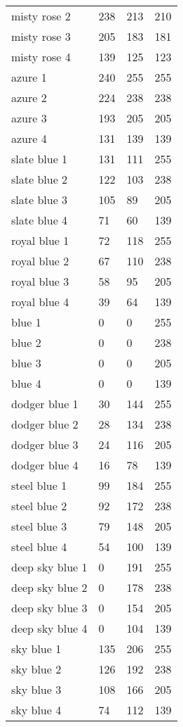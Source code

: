 \begin{center}
\begin{tabular}{llll}
  misty rose 2 & 238 & 213 & 210  \\
  misty rose 3 & 205 & 183 & 181  \\
  misty rose 4 & 139 & 125 & 123  \\
  azure 1 & 240 & 255 & 255  \\
  azure 2 & 224 & 238 & 238  \\
  azure 3 & 193 & 205 & 205  \\
  azure 4 & 131 & 139 & 139  \\
  slate blue 1 & 131 & 111 & 255  \\
  slate blue 2 & 122 & 103 & 238  \\
  slate blue 3 & 105 & 89 & 205  \\
  slate blue 4 & 71 & 60 & 139  \\
  royal blue 1 & 72 & 118 & 255  \\
  royal blue 2 & 67 & 110 & 238  \\
  royal blue 3 & 58 & 95 & 205  \\
  royal blue 4 & 39 & 64 & 139  \\
  blue 1 & 0 & 0 & 255  \\
  blue 2 & 0 & 0 & 238  \\
  blue 3 & 0 & 0 & 205  \\
  blue 4 & 0 & 0 & 139  \\
  dodger blue 1 & 30 & 144 & 255  \\
  dodger blue 2 & 28 & 134 & 238  \\
  dodger blue 3 & 24 & 116 & 205  \\
  dodger blue 4 & 16 & 78 & 139  \\
  steel blue 1 & 99 & 184 & 255  \\
  steel blue 2 & 92 & 172 & 238  \\
  steel blue 3 & 79 & 148 & 205  \\
  steel blue 4 & 54 & 100 & 139  \\
  deep sky blue 1 & 0 & 191 & 255  \\
  deep sky blue 2 & 0 & 178 & 238  \\
  deep sky blue 3 & 0 & 154 & 205  \\
  deep sky blue 4 & 0 & 104 & 139  \\
  sky blue 1 & 135 & 206 & 255  \\
  sky blue 2 & 126 & 192 & 238  \\
  sky blue 3 & 108 & 166 & 205  \\
  sky blue 4 & 74 & 112 & 139  \\

\end{tabular}
\end{center}
